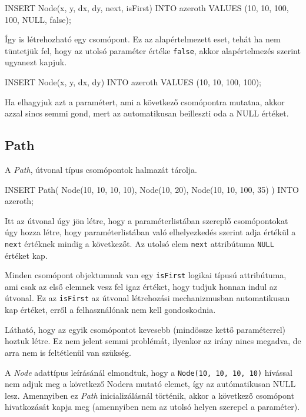 \begin{sql}
INSERT Node(x, y, dx, dy, next, isFirst) INTO 
azeroth VALUES (10, 10, 100, 100, NULL, false);
\end{sql}

Így is létrehozható egy csomópont. Ez az alapértelmezett eset, tehát ha nem tüntetjük fel, hogy az utolsó paraméter értéke \texttt{false}, akkor alapértelmezés szerint ugyanezt kapjuk.


\begin{sql}
INSERT Node(x, y, dx, dy) INTO azeroth VALUES (10, 10, 100, 100);
\end{sql}
Ha elhagyjuk azt a paramétert, ami a következő csomópontra mutatna, akkor azzal sincs semmi gond, mert az automatikusan beilleszti oda a NULL értéket.

\subsection{Path}

A \textit{Path}, útvonal típus csomópontok halmazát tárolja.

\begin{sql}
INSERT Path(
    Node(10, 10, 10, 10),
    Node(10, 20),
    Node(10, 10, 100, 35)
) INTO azeroth;
\end{sql}

Itt az útvonal úgy jön létre, hogy a paraméterlistában szereplő csomópontokat úgy hozza létre, hogy paraméterlistában való elhelyezkedés szerint adja értékül a \texttt{next} értéknek mindig a következőt. Az utolsó elem \texttt{next} attribútuma \texttt{NULL} értéket kap.

Minden csomópont objektumnak van egy \texttt{isFirst} logikai típusú attribútuma, ami csak az első elemnek vesz fel igaz értéket, hogy tudjuk honnan indul az útvonal. Ez az \texttt{isFirst} az útvonal létrehozási mechanizmusban automatikusan kap értéket, erről a felhasználónak nem kell gondoskodnia.

Látható, hogy az egyik csomópontot kevesebb (mindössze kettő paraméterrel) hoztuk létre. Ez nem jelent semmi problémát, ilyenkor az irány nincs megadva, de arra nem is feltétlenül van szükség.

A \textit{Node} adattípus leírásánál elmondtuk, hogy a \texttt{Node(10, 10, 10, 10)} hívással nem adjuk meg a következő Nodera mutató elemet, így az autómatikusan NULL lesz. Amennyiben ez  \textit{Path} inicializálásnál történik, akkor a következő csomópont hivatkozását kapja meg (amennyiben nem az utolsó helyen szerepel a paraméter).

